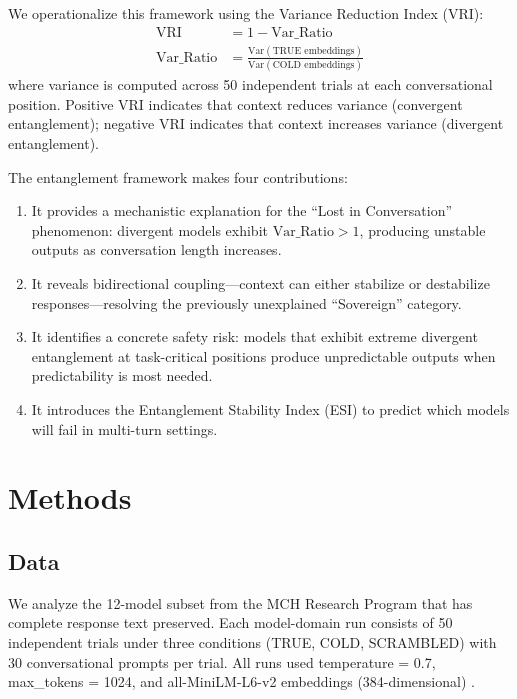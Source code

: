 \documentclass[11pt]{article}
\begin{document}
We operationalize this framework using the Variance Reduction Index (VRI):
\begin{align}
    \text{VRI} &= 1 - \text{Var\_Ratio} \label{eq:vri}\\
    \text{Var\_Ratio} &= \frac{\text{Var}(\text{TRUE embeddings})}{\text{Var}(\text{COLD embeddings})} \label{eq:varratio}
\end{align}
where variance is computed across 50 independent trials at each conversational position. Positive VRI indicates that context reduces variance (convergent entanglement); negative VRI indicates that context increases variance (divergent entanglement).

The entanglement framework makes four contributions:
\begin{enumerate}
    \item It provides a mechanistic explanation for the ``Lost in Conversation'' phenomenon: divergent models exhibit $\text{Var\_Ratio} > 1$, producing unstable outputs as conversation length increases.
    \item It reveals bidirectional coupling---context can either stabilize or destabilize responses---resolving the previously unexplained ``Sovereign'' category.
    \item It identifies a concrete safety risk: models that exhibit extreme divergent entanglement at task-critical positions produce unpredictable outputs when predictability is most needed.
    \item It introduces the Entanglement Stability Index (ESI) to predict which models will fail in multi-turn settings.
\end{enumerate}

\section{Methods}

\subsection{Data}

We analyze the 12-model subset from the MCH Research Program that has complete response text preserved. Each model-domain run consists of 50 independent trials under three conditions (TRUE, COLD, SCRAMBLED) with 30 conversational prompts per trial. All runs used temperature = 0.7, max\_tokens = 1024, and all-MiniLM-L6-v2 embeddings (384-dimensional) \citep{reimers2019sentence}.
\end{document}
